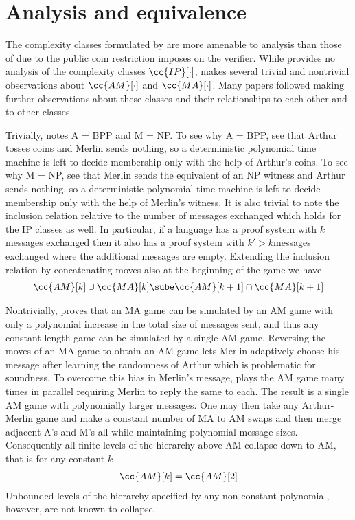 \section{Analysis and equivalence}

The complexity classes formulated by \cite{Bab85} are more amenable to analysis than those of \cite{GMR85} due to the public coin restriction \cite{Bab85} imposes on the verifier.
While \cite{GMR85} provides no analysis of the complexity classes $\cc{IP}[\cdot]$, \cite{Bab85} makes several trivial and nontrivial observations about $\cc{AM}[\cdot]$ and $\cc{MA}[\cdot]$.
Many papers followed making further observations about these classes and their relationships to each other and to other classes.

Trivially, \cite{Bab85} notes A = BPP and M = NP.
To see why A = BPP, see that Arthur tosses coins and Merlin sends nothing, so a deterministic polynomial time machine is left to decide membership only with the help of Arthur's coins.
To see why M = NP, see that Merlin sends the equivalent of an NP witness and Arthur sends nothing, so a deterministic polynomial time machine is left to decide membership only with the help of Merlin's witness.
It is also trivial to note the inclusion relation relative to the number of messages exchanged which holds for the IP classes as well.
In particular, if a language has a proof system with $k$ messages exchanged then it also has a proof system with $k'>k$messages exchanged where the additional messages are empty.
Extending the inclusion relation by concatenating moves also at the beginning of the game we have
\begin{align}
    \cc{AM}[k]\cup\cc{MA}[k] \sube \cc{AM}[k+1]\cap\cc{MA}[k+1]
\end{align}

Nontrivially, \cite{Bab85} proves that an MA game can be simulated by an AM game with only a polynomial increase in the total size of messages sent, and thus any constant length game can be simulated by a single AM game.
Reversing the moves of an MA game to obtain an AM game lets Merlin adaptively choose his message after learning the randomness of Arthur which is problematic for soundness.
To overcome this bias in Merlin's message, \cite{Bab85} plays the AM game many times in parallel requiring Merlin to reply the same to each.
The result is a single AM game with polynomially larger messages.
One may then take any Arthur-Merlin game and make a constant number of MA to AM swaps and then merge adjacent A's and M's all while maintaining polynomial message sizes.
Consequently all finite levels of the hierarchy above AM collapse down to AM, that is for any constant $k$
\begin{align}
    \cc{AM}[k] = \cc{AM}[2]
\end{align}
Unbounded levels of the hierarchy specified by any non-constant polynomial, however, are not known to collapse.

